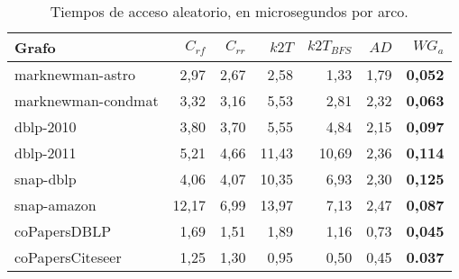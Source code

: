 \begin{table}
	\caption{Tiempos de acceso aleatorio, en microsegundos por arco.}
	\label{table:timesRandom}
	\centering
	\begin{tabular}{l|r|r|r|r|r|r}
		\toprule
		Grafo & $C_{rf}$ & $C_{rr}$ & $k2T$ & $k2T_{BFS}$ & $AD$ & $WG_{a}$ \\
        \midrule    
        marknewman-astro & 2,97 & 2,67 & 2,58 & 1,33 & 1,79 & \textbf{0,052} \\
        marknewman-condmat & 3,32 & 3,16 & 5,53 & 2,81 & 2,32 & \textbf{0,063} \\
        dblp-2010 & 3,80 & 3,70 & 5,55 & 4,84 & 2,15 & \textbf{0,097} \\
        dblp-2011 & 5,21 & 4,66 & 11,43 & 10,69 & 2,36 & \textbf{0,114} \\
        snap-dblp & 4,06 & 4,07 & 10,35 & 6,93 & 2,30 & \textbf{0,125} \\
        snap-amazon & 12,17 & 6,99 & 13,97 & 7,13 & 2,47 & \textbf{0,087} \\
        coPapersDBLP & 1,69 & 1,51 & 1,89 & 1,16 & 0,73 & \textbf{0,045} \\
        coPapersCiteseer & 1,25 & 1,30 & 0,95 & 0,50 & 0,45 & \textbf{0.037} \\
        \bottomrule
	\end{tabular}
\end{table}
